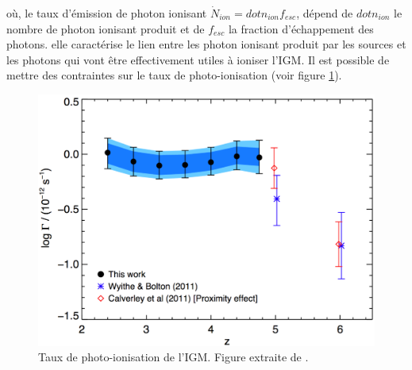 où, le taux d'émission de photon ionisant $\dot{N}_{ion}= dot{n}_{ion} f_{esc}$, dépend de $dot{n}_{ion}$ le nombre de photon ionisant produit et de $f_{esc}$ la fraction d'échappement des photons. elle caractérise le lien entre les photon ionisant produit par les sources et les photons qui vont être effectivement utiles à ioniser l'\ac{IGM}.
Il est possible de mettre des contraintes sur le taux de photo-ionisation (voir figure \ref{fig:photoionisationrate}).


\begin{figure}
        \includegraphics[width=.95\linewidth]{img/01/photon_obs.pdf} 
        \caption[Taux de photo-ionisation ]{Taux de photo-ionisation de l'\ac{IGM}. 
        Figure extraite de \cite{2013MNRAS.436.1023B}.
 		\label{fig:photoionisationrate}}
\end{figure}






